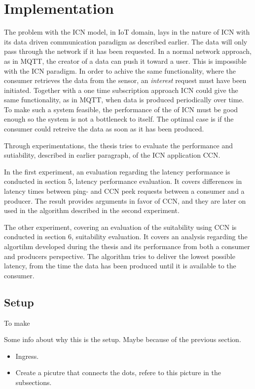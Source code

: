 \section{Implementation}
The problem with the ICN model, in IoT domain, lays in the nature of ICN with its data driven communication paradigm as described earlier. The data will only pass through the network if it has been requested. In a normal network approach, as in MQTT, the creator of a data can push it toward a user. This is impossible with the ICN paradigm. 
In order to achive the same functionality, where the consumer retrieves the data from the sensor, an \textit{interest} request must have been initiated. Together with a one time subscription approach ICN could give the same functionality, as in MQTT, when data is produced periodically over time. To make such a system feasible, the performance of the of ICN must be good enough so the system is not a bottleneck to itself. The optimal case is if the consumer could retreive the data as soon as it has been produced.

Through experimentations, the thesis tries to evaluate the performance and sutiability, described in earlier paragraph, of the ICN application CCN.

In the first experiment, an evaluation regarding the latency performance is conducted in section 5, latency performance evaluation. It covers differences in latency times between ping- and CCN peek requests between a consumer and a producer. The result provides arguments in favor of CCN, and they are later on used in the algorithm described in the second experiment.

The other experiment, covering an evaluation of the suitability using CCN is conducted in section 6, suitability evaluation. It covers an analysis regarding the algortihm developed during the thesis and its performance from both a consumer and producers perspective. The algorithm tries to deliver the lowest possible latency, from the time the data has been produced until it is available to the consumer. 


\subsection{Setup}
To make 

Some info about why this is the setup. Maybe because of the previous section.
\begin{itemize}
\item Ingress.
\item Create a picutre that connects the dots, refere to this picture in the subsections.
\end{itemize}








